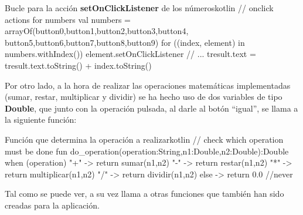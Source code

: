 \documentclass{\ClassPath/viu-tfm-template}
\begin{document}
\begin{mycode}{Bucle para la acción \textbf{setOnClickListener} de los números}{kotlin}{}
// onclick actions for numbers
val numbers = arrayOf(button0,button1,button2,button3,button4,
button5,button6,button7,button8,button9)
for ((index, element) in numbers.withIndex()) {
    element.setOnClickListener {
        // ...
        tresult.text = tresult.text.toString() + index.toString()
    }
}
\end{mycode}

Por otro lado, a la hora de realizar las operaciones matemáticas implementadas (sumar, restar, multiplicar y dividir) se ha hecho uso de dos variables de tipo \textbf{Double}, que junto con la operación pulsada, al darle al botón “igual”, se llama a la siguiente función:

\begin{mycode}{Función que determina la operación a realizar}{kotlin}{}
// check which operation must be done
fun do_operation(operation:String,n1:Double,n2:Double):Double{
    when (operation){
        "+" -> return sumar(n1,n2)
        "-" -> return restar(n1,n2)
        "*" -> return multiplicar(n1,n2)
        "/" -> return dividir(n1,n2)
        else -> return 0.0 //never
    }
}
\end{mycode}

Tal como se puede ver, a su vez llama a otras funciones que también han sido creadas para la aplicación.

%
%
%
\end{document}

